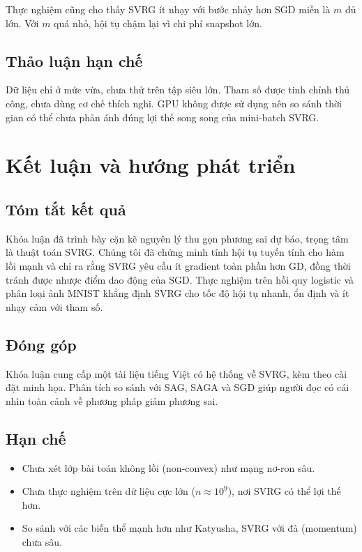 \documentclass[12pt,a4paper]{report}
\theoremstyle{definition}
\begin{document}
Thực nghiệm cũng cho thấy SVRG ít nhạy với bước nhảy hơn SGD miễn là $m$ đủ lớn. Với $m$ quá nhỏ, hội tụ chậm lại vì chi phí snapshot lớn.

\section{Thảo luận hạn chế}
Dữ liệu chỉ ở mức vừa, chưa thử trên tập siêu lớn. Tham số được tinh chỉnh thủ công, chưa dùng cơ chế thích nghi. GPU không được sử dụng nên so sánh thời gian có thể chưa phản ánh đúng lợi thế song song của mini-batch SVRG.

\chapter{Kết luận và hướng phát triển}

\section{Tóm tắt kết quả}
Khóa luận đã trình bày cặn kẽ nguyên lý thu gọn phương sai dự báo, trọng tâm là thuật toán SVRG. Chúng tôi đã chứng minh tính hội tụ tuyến tính cho hàm lồi mạnh và chỉ ra rằng SVRG yêu cầu ít gradient toàn phần hơn GD, đồng thời tránh được nhược điểm dao động của SGD. Thực nghiệm trên hồi quy logistic và phân loại ảnh MNIST khẳng định SVRG cho tốc độ hội tụ nhanh, ổn định và ít nhạy cảm với tham số.

\section{Đóng góp}
Khóa luận cung cấp một tài liệu tiếng Việt có hệ thống về SVRG, kèm theo cài đặt minh họa. Phân tích so sánh với SAG, SAGA và SGD giúp người đọc có cái nhìn toàn cảnh về phương pháp giảm phương sai.

\section{Hạn chế}
\begin{itemize}
    \item Chưa xét lớp bài toán không lồi (non‑convex) như mạng nơ-ron sâu.
    \item Chưa thực nghiệm trên dữ liệu cực lớn ($n\approx 10^9$), nơi SVRG có thể lợi thế hơn.
    \item So sánh với các biến thể mạnh hơn như Katyusha, SVRG với đà (momentum) chưa sâu.
\end{itemize}
\end{document}
